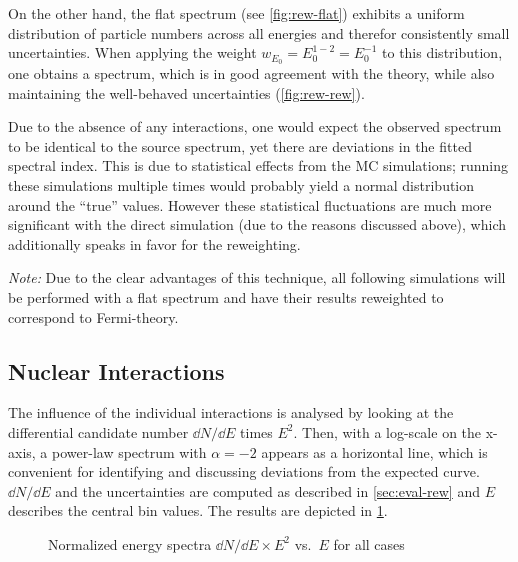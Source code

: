 On the other hand, the flat spectrum (see \cref{fig:rew-flat}) exhibits a
uniform distribution of particle numbers across all energies and therefor
consistently small uncertainties. When applying the weight
$w_{E_0}=E_0^{1-2}=E_0^{-1}$ to this distribution, one obtains a spectrum,
which is in good agreement with the theory, while also maintaining the
well-behaved uncertainties (\cref{fig:rew-rew}).

Due to the absence of any interactions, one would expect the observed spectrum
to be identical to the source spectrum, yet there are deviations in the fitted
spectral index. This is due to statistical effects from the MC simulations;
running these simulations multiple times would probably yield a normal
distribution around the \enquote{true} values. However these statistical
fluctuations are much more significant with the direct simulation (due to the
reasons discussed above), which additionally speaks in favor for the
reweighting.

\emph{Note:} Due to the clear advantages of this technique, all following
simulations will be performed with a flat spectrum and have their results
reweighted to correspond to Fermi-theory.


\subsection{Nuclear Interactions}
The influence of the individual interactions is analysed by looking at the
differential candidate number $\dd{N}/\dd{E}$ times $E^2$. Then, with a
log-scale on the x-axis, a power-law spectrum with $\alpha=-2$ appears as a
horizontal line, which is convenient for identifying and discussing deviations
from the expected curve.
$\dd{N}/\dd{E}$ and the uncertainties are computed as described in
\cref{sec:eval-rew} and $E$ describes the central bin values. The results
are depicted in \cref{fig:interactions}.

\begin{figure}[ht!]
    \centering
    
    \caption{Normalized energy spectra $\dd{N}/\dd{E}\times{E^2}$ vs.~$E$ for
        all cases}
    \label{fig:interactions}
\end{figure}

